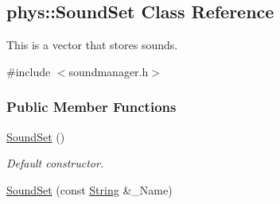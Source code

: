 \hypertarget{classphys_1_1SoundSet}{
\subsection{phys::SoundSet Class Reference}
\label{classphys_1_1SoundSet}
}


This is a vector that stores sounds.  




{\ttfamily \#include $<$soundmanager.h$>$}

\subsubsection*{Public Member Functions}
\begin{DoxyCompactItemize}
\item 
\hypertarget{classphys_1_1SoundSet_a87c99d3ef6cda1b6183edc3320636abb}{
\hyperlink{classphys_1_1SoundSet_a87c99d3ef6cda1b6183edc3320636abb}{SoundSet} ()}
\label{classphys_1_1SoundSet_a87c99d3ef6cda1b6183edc3320636abb}

\begin{DoxyCompactList}\small\item\em Default constructor. \item\end{DoxyCompactList}\item 
\hypertarget{classphys_1_1SoundSet_a3237068484b781ed267cc41050cd6628}{
\hyperlink{classphys_1_1SoundSet_a3237068484b781ed267cc41050cd6628}{SoundSet} (const \hyperlink{namespacephys_aa03900411993de7fbfec4789bc1d392e}{String} \&\_\-Name)}
\label{classphys_1_1SoundSet_a3237068484b781ed267cc41050cd6628}


\end{DoxyCompactItemize}
